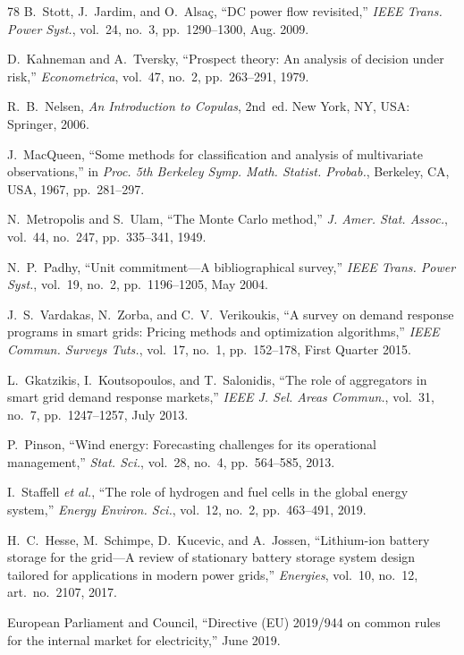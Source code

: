 \documentclass[journal]{IEEEtran}
\begin{document}
\begin{thebibliography}{78}
 B.~Stott, J.~Jardim, and O.~Alsa\c{c}, ``DC power flow revisited,'' \textit{IEEE Trans. Power Syst.}, vol.~24, no.~3, pp.~1290--1300, Aug. 2009.

 D.~Kahneman and A.~Tversky, ``Prospect theory: An analysis of decision under risk,'' \textit{Econometrica}, vol.~47, no.~2, pp.~263--291, 1979.

 R.~B.~Nelsen, \textit{An Introduction to Copulas}, 2nd~ed. New York, NY, USA: Springer, 2006.

 J.~MacQueen, ``Some methods for classification and analysis of multivariate observations,'' in \textit{Proc. 5th Berkeley Symp. Math. Statist. Probab.}, Berkeley, CA, USA, 1967, pp.~281--297.

 N.~Metropolis and S.~Ulam, ``The Monte Carlo method,'' \textit{J. Amer. Stat. Assoc.}, vol.~44, no.~247, pp.~335--341, 1949.

 N.~P.~Padhy, ``Unit commitment---A bibliographical survey,'' \textit{IEEE Trans. Power Syst.}, vol.~19, no.~2, pp.~1196--1205, May 2004.

 J.~S.~Vardakas, N.~Zorba, and C.~V.~Verikoukis, ``A survey on demand response programs in smart grids: Pricing methods and optimization algorithms,'' \textit{IEEE Commun. Surveys Tuts.}, vol.~17, no.~1, pp.~152--178, First Quarter 2015.

 L.~Gkatzikis, I.~Koutsopoulos, and T.~Salonidis, ``The role of aggregators in smart grid demand response markets,'' \textit{IEEE J. Sel. Areas Commun.}, vol.~31, no.~7, pp.~1247--1257, July 2013.

 P.~Pinson, ``Wind energy: Forecasting challenges for its operational management,'' \textit{Stat. Sci.}, vol.~28, no.~4, pp.~564--585, 2013.

 I.~Staffell \textit{et al.}, ``The role of hydrogen and fuel cells in the global energy system,'' \textit{Energy Environ. Sci.}, vol.~12, no.~2, pp.~463--491, 2019.

 H.~C.~Hesse, M.~Schimpe, D.~Kucevic, and A.~Jossen, ``Lithium-ion battery storage for the grid---A review of stationary battery storage system design tailored for applications in modern power grids,'' \textit{Energies}, vol.~10, no.~12, art.~no.~2107, 2017.

 European Parliament and Council, ``Directive (EU) 2019/944 on common rules for the internal market for electricity,'' June 2019.

\end{thebibliography}
\end{document}

